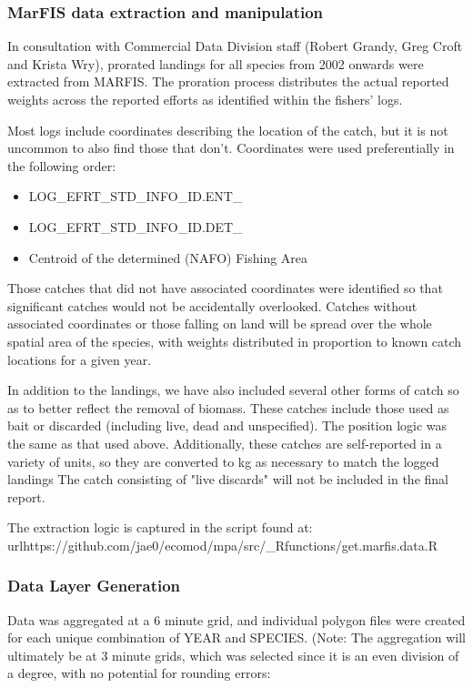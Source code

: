 \documentclass[letterpaper,portrait,11pt]{scrartcl}
\numberwithin{equation}{section}		%
\numberwithin{figure}{section}		%
\numberwithin{table}{section}				%
\begin{document}
\subsubsection{MarFIS data extraction and manipulation}

In consultation with Commercial Data Division staff (Robert Grandy, Greg Croft and Krista Wry), prorated landings for all species from 2002 onwards were extracted from MARFIS. The proration process distributes the actual reported weights across the reported efforts as identified within the fishers' logs.

Most logs include coordinates describing the location of the catch, but it is not uncommon to also find those that don't.  Coordinates were used preferentially in the following order:
\begin{itemize}
  \item LOG\_EFRT\_STD\_INFO\_ID.ENT\_
  \item LOG\_EFRT\_STD\_INFO\_ID.DET\_
  \item Centroid of the determined (NAFO) Fishing Area
\end{itemize}

Those catches that did not have associated coordinates were identified so that significant catches would not be accidentally overlooked. Catches without associated coordinates or those falling on land will be spread over the whole spatial area of the species, with weights distributed in proportion to known catch locations for a given year.

In addition to the landings, we have also included several other forms of catch so as to better reflect the removal of biomass. These catches include those used as bait or discarded (including live, dead and unspecified). The position logic was the same as that used above. Additionally, these catches are self-reported in a variety of units, so they are converted to kg as necessary to match the logged landings The catch consisting of "live discards" will not be included in the final report.

The extraction logic is captured in the script found at: \\url{https://github.com/jae0/ecomod/mpa/src/\_Rfunctions/get.marfis.data.R}

\subsubsection{Data Layer Generation}

Data was aggregated at a 6 minute grid, and individual polygon files were created for each unique combination of YEAR and SPECIES. (Note: The aggregation will ultimately be at 3 minute grids, which was selected since it is an even division of a degree, with no potential for rounding errors: 
\end{document}
